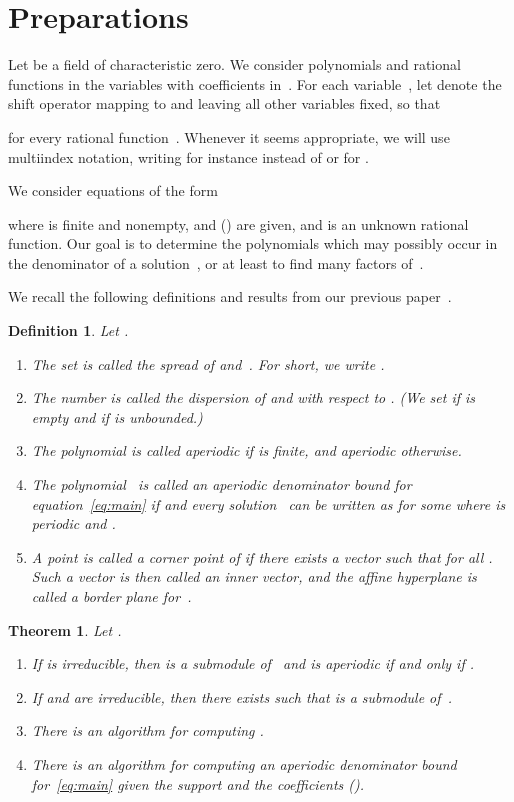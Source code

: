 \documentclass[a4paper]{sig-alternate}
\newtheorem{theorem}{Theorem}
\newtheorem{definition}{Definition}
\begin{document}
\section{Preparations}

Let  be a field of characteristic zero. We consider polynomials and rational functions
in the  variables  with coefficients in~. For each variable~,
let  denote the shift operator mapping  to  and leaving all other variables
fixed, so that

for every rational function~. Whenever it seems appropriate, we will use multiindex
notation, writing for instance  instead of  or 
for .

We consider equations of the form

where  is finite and nonempty,  and 
() are given, and  is an unknown rational function.
Our goal is to determine the polynomials  which may possibly occur in the denominator
of a solution~, or at least to find many factors of~.

We recall the following definitions and results from our previous paper~\cite{kauers10b}.

\begin{definition} Let .
\begin{enumerate}
\item The set  is called
  the \emph{spread} of  and~.
  For short, we write .
\item The number  is called
  the \emph{dispersion} of  and  with respect to . (We set
   if  is empty and  if  is unbounded.)
\item The polynomial  is called \emph{aperiodic} if  is finite, and \emph{aperiodic}
  otherwise.
\item The polynomial~ is called an \emph{aperiodic denominator bound} for equation~\eqref{eq:main}
  if  and every solution~ can be written as  for some 
  where  is periodic and .
\item A point  is called a \emph{corner point} of 
  if there exists a vector  such that  for all
  . Such a vector  is then called an \emph{inner vector,}
  and the affine hyperplane  is called a
  \emph{border plane} for~.

  \medskip
  \centerline{}

\end{enumerate}
\end{definition}

\begin{theorem}\label{thm:1} Let .
\begin{enumerate}
\item If  is irreducible, then  is a submodule of~ and
   is aperiodic if and only if .
\item\label{thm:1.2} If  and  are irreducible, then there exists  such that
   is a submodule of~.
\item There is an algorithm for computing .
\item There is an algorithm for computing an aperiodic denominator bound for~\eqref{eq:main}
  given the support  and the coefficients  ().
\end{enumerate}
\end{theorem}
\end{document}

